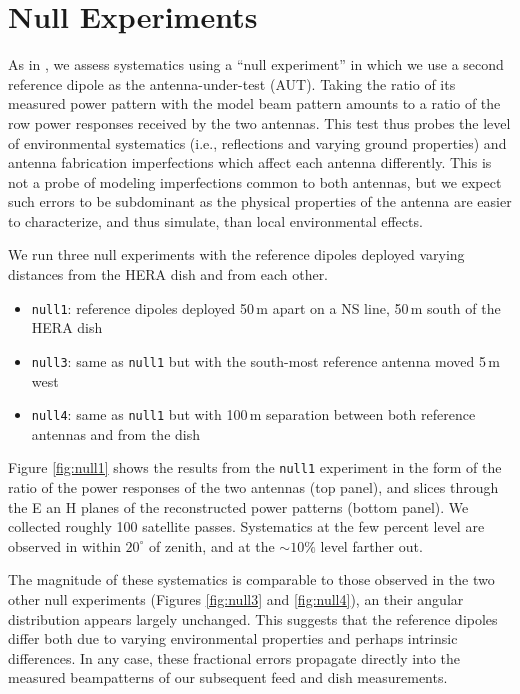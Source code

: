 \documentclass[preprint]{aastex}
\begin{document}
\section{Null Experiments}

As in \citet{neben15}, we assess systematics using a ``null experiment'' in which we use a second reference dipole as the antenna-under-test (AUT). Taking the ratio of its measured power pattern with the model beam pattern amounts to a ratio of the row power responses received by the two antennas. This test thus probes the level of environmental systematics (i.e., reflections and varying ground properties) and antenna fabrication imperfections which affect each antenna differently. This is not a probe of modeling imperfections common to both antennas, but we expect such errors to be subdominant as the physical properties of the antenna are easier to characterize, and thus simulate, than local environmental effects. 

We run three null experiments with the reference dipoles deployed varying distances from the HERA dish and from each other.

\begin{itemize}
\item \texttt{null1}: reference dipoles deployed 50\,m apart on a NS line, 50\,m south of the HERA dish
\item \texttt{null3}: same as \texttt{null1} but with the south-most reference antenna moved 5\,m west
\item \texttt{null4}: same as \texttt{null1} but with 100\,m separation between both reference antennas and from the dish
\end{itemize}

Figure \ref{fig:null1} shows the results from the \texttt{null1} experiment in the form of the ratio of the power responses of the two antennas (top panel), and slices through the E an H planes of the reconstructed power patterns (bottom panel). We collected roughly 100 satellite passes. Systematics at the few percent level are observed in  within $20^\circ$ of zenith, and at the $\sim10\%$ level farther out.

The magnitude of these systematics is comparable to those observed in the two other null experiments (Figures \ref{fig:null3} and \ref{fig:null4}), an their angular distribution appears largely unchanged. This suggests that the reference dipoles differ both due to varying environmental properties and perhaps intrinsic differences. In any case, these fractional errors propagate directly into the measured beampatterns of our subsequent feed and dish measurements.  
\end{document}
